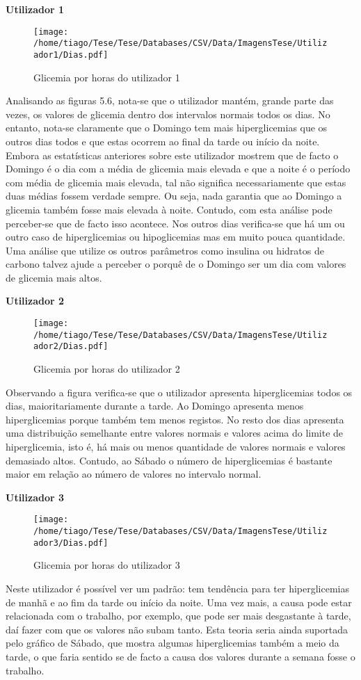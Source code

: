 \textbf{Utilizador 1}

\begin{figure}[H]
\centering
\texttt{[image: /home/tiago/Tese/Tese/Databases/CSV/Data/ImagensTese/Utilizador1/Dias.pdf]}
\caption{Glicemia por horas do utilizador 1}
\end{figure}
Analisando as figuras 5.6, nota-se que o utilizador mantém, grande parte das vezes, os valores de glicemia dentro dos intervalos normais todos os dias. No entanto, nota-se claramente que o Domingo tem mais hiperglicemias que os outros dias todos e que estas ocorrem ao final da tarde ou início da noite. Embora as estatísticas anteriores sobre este utilizador mostrem que de facto o Domingo é o dia com a média de glicemia mais elevada e que a noite é o período com média de glicemia mais elevada, tal não significa necessariamente que estas duas médias fossem verdade sempre. Ou seja, nada garantia que ao Domingo a glicemia também fosse mais elevada à noite. Contudo, com esta análise pode perceber-se que de facto isso acontece. Nos outros dias verifica-se que há um ou outro caso de hiperglicemias ou hipoglicemias mas em muito pouca quantidade. Uma análise que utilize os outros parâmetros como insulina ou hidratos de carbono talvez ajude a perceber o porquê de o Domingo ser um dia com valores de glicemia mais altos. 

\textbf{Utilizador 2}


\begin{figure}[H]
\centering
\texttt{[image: /home/tiago/Tese/Tese/Databases/CSV/Data/ImagensTese/Utilizador2/Dias.pdf]}
\caption{Glicemia por horas do utilizador 2}
\end{figure}
Observando a figura verifica-se que o utilizador apresenta hiperglicemias todos os dias, maioritariamente durante a tarde. Ao Domingo apresenta menos hiperglicemias porque também tem menos registos. No resto dos dias apresenta uma distribuição semelhante entre valores normais e valores acima do limite de hiperglicemia, isto é, há mais ou menos quantidade de valores normais e valores demasiado altos. Contudo, ao Sábado o número de hiperglicemias é bastante maior em relação ao número de valores no intervalo normal.



\textbf{Utilizador 3}

\begin{figure}[H]
\centering
\texttt{[image: /home/tiago/Tese/Tese/Databases/CSV/Data/ImagensTese/Utilizador3/Dias.pdf]}
\caption{Glicemia por horas do utilizador 3}
\end{figure}
Neste utilizador é possível ver um padrão: tem tendência para ter hiperglicemias de manhã e ao fim da tarde ou início da noite. Uma vez mais, a causa pode estar relacionada com o trabalho, por exemplo, que pode ser mais desgastante à tarde, daí fazer com que os valores não subam tanto. Esta teoria seria ainda suportada pelo gráfico de Sábado, que mostra algumas hiperglicemias também a meio da tarde, o que faria sentido se de facto a causa dos valores durante a semana fosse o trabalho. 

